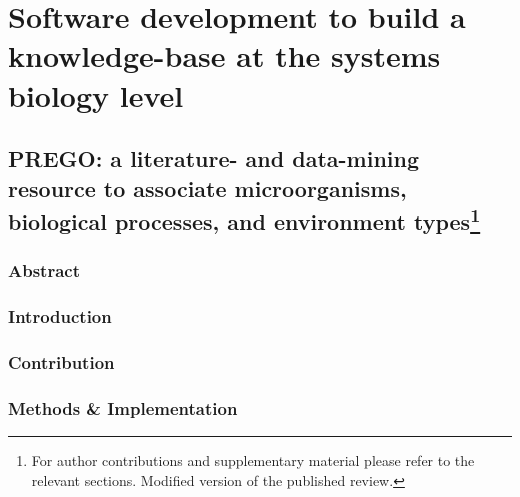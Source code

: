 % 
% 


\chapter{Software development to build a knowledge-base at the systems biology level}
\label{cha:prego}



\section[PREGO: a literature- and data-mining resource to associate microorganisms, biological processes, and environment types]{PREGO: a literature- and data-mining resource to associate microorganisms, biological processes, and environment types\footnote{
   For author contributions and supplementary material please refer to the relevant sections. 
   Modified version of the published review.
   }
}

\subsection{Abstract}

\subsection{Introduction}


\subsection{Contribution}

\subsection{Methods \& Implementation}




